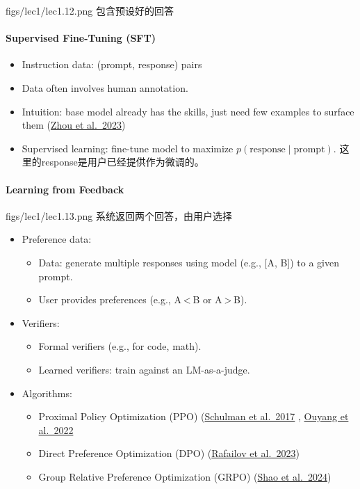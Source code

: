 \MarginImageWithNote
  {figs/lec1/lec1.12.png}
  {}
  {包含预设好的回答}

\paragraph{Supervised Fine-Tuning (SFT)}
\begin{itemize}[leftmargin=*]
  \item Instruction data: (prompt, response) pairs 
  \item Data often involves human annotation.
  \item Intuition: base model already has the skills, just need few examples to surface them (\href{https://arxiv.org/abs/2311.07911}{Zhou et al.\ 2023})
  \item Supervised learning: fine-tune model to maximize \(p(\text{response}\mid\text{prompt})\). 这里的response是用户已经提供作为微调的。
\end{itemize}

\clearpage
\paragraph{Learning from Feedback}
\MarginImageWithNote
  {figs/lec1/lec1.13.png}
  {}
  {系统返回两个回答，由用户选择}

\begin{itemize}[leftmargin=*]
  \item Preference data:
    \begin{itemize}[leftmargin=1em,label={},noitemsep]
      \item Data: generate multiple responses using model (e.g., [A, B]) to a given prompt.
      \item User provides preferences (e.g., A < B or A > B).
    \end{itemize}

  \item Verifiers:
    \begin{itemize}[leftmargin=1em,label={},noitemsep]
      \item Formal verifiers (e.g., for code, math).
      \item Learned verifiers: train against an LM-as-a-judge.
    \end{itemize}

  \item Algorithms:
    \begin{itemize}[leftmargin=1em,label={},noitemsep]
      \item Proximal Policy Optimization (PPO) (\href{https://arxiv.org/abs/1707.06347}{Schulman et al.\ 2017} , \href{https://arxiv.org/abs/2203.02155}{Ouyang et al.\ 2022} 
      \item Direct Preference Optimization (DPO) (\href{https://arxiv.org/abs/2305.18290}{Rafailov et al.\ 2023}) 
      \item Group Relative Preference Optimization (GRPO) (\href{https://arxiv.org/abs/2402.03300}{Shao et al.\ 2024}) 
    \end{itemize}
\end{itemize}
\clearpage

